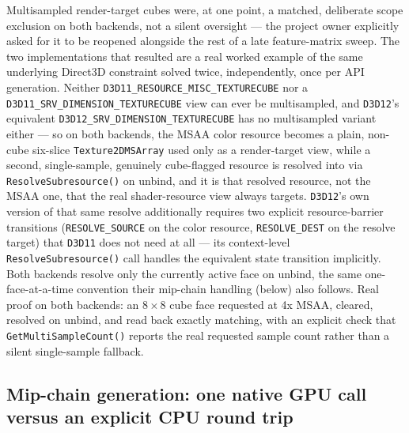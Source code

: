 Multisampled render-target cubes were, at one point, a matched, deliberate scope exclusion on
both backends, not a silent oversight --- the project owner explicitly asked for it to be
reopened alongside the rest of a late feature-matrix sweep. The two implementations that
resulted are a real worked example of the same underlying Direct3D constraint solved twice,
independently, once per API generation. Neither \texttt{D3D11\_RESOURCE\_MISC\_TEXTURECUBE} nor
a \texttt{D3D11\_SRV\_DIMENSION\_TEXTURECUBE} view can ever be multisampled, and \texttt{D3D12}'s
equivalent \texttt{D3D12\_SRV\_DIMENSION\_TEXTURECUBE} has no multisampled variant either --- so
on both backends, the MSAA color resource becomes a plain, non-cube six-slice
\texttt{Texture2DMSArray} used only as a render-target view, while a second, single-sample,
genuinely cube-flagged resource is resolved into via \texttt{ResolveSubresource()} on unbind, and
it is that resolved resource, not the MSAA one, that the real shader-resource view always
targets. \texttt{D3D12}'s own version of that same resolve additionally requires two explicit
resource-barrier transitions (\texttt{RESOLVE\_SOURCE} on the color resource,
\texttt{RESOLVE\_DEST} on the resolve target) that \texttt{D3D11} does not need at all --- its
context-level \texttt{ResolveSubresource()} call handles the equivalent state transition
implicitly. Both backends resolve only the currently active face on unbind, the same
one-face-at-a-time convention their mip-chain handling (below) also follows. Real proof on both
backends: an $8\times8$ cube face requested at 4x MSAA, cleared, resolved on unbind, and read
back exactly matching, with an explicit check that \texttt{GetMultiSampleCount()} reports the
real requested sample count rather than a silent single-sample fallback.

\subsection{Mip-chain generation: one native GPU call versus an explicit CPU round trip}

